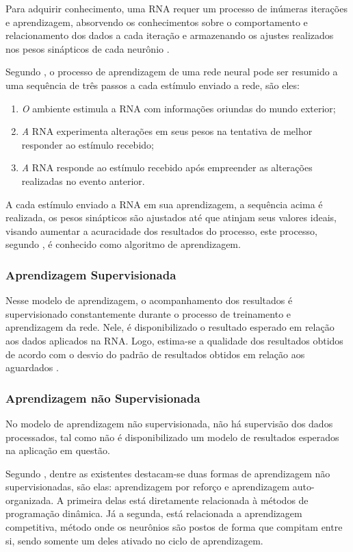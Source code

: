 Para adquirir conhecimento, uma RNA requer um processo de inúmeras iterações e aprendizagem, absorvendo os conhecimentos sobre o comportamento e relacionamento dos dados a cada iteração e armazenando os ajustes realizados nos pesos sinápticos de cada neurônio \cite{neto}.

Segundo , o processo de aprendizagem de uma rede neural pode ser resumido a uma sequência de três passos a cada estímulo enviado a rede, são eles:

\begin{enumerate}
	\item \textit O ambiente estimula a RNA com informações oriundas do mundo exterior;
	\item \textit A RNA experimenta alterações em seus pesos na tentativa de melhor responder ao estímulo recebido;
	\item \textit A RNA responde ao estímulo recebido após empreender as alterações realizadas no evento anterior.
\end{enumerate}

A cada estímulo enviado a RNA em sua aprendizagem, a sequência acima é realizada, os pesos sinápticos são ajustados até que atinjam seus valores ideais, visando aumentar a acuracidade dos resultados do processo, este processo, segundo , é conhecido como algoritmo de aprendizagem.

\subsubsection{Aprendizagem Supervisionada}
Nesse modelo de aprendizagem, o acompanhamento dos resultados é supervisionado constantemente durante o processo de treinamento e aprendizagem da rede. Nele, é disponibilizado o resultado esperado em relação aos dados aplicados na RNA. Logo, estima-se a qualidade dos resultados obtidos de acordo com o desvio do padrão de resultados obtidos em relação aos aguardados \cite{haykin2009}.

\subsubsection{Aprendizagem não Supervisionada}
No modelo de aprendizagem não supervisionada, não há supervisão dos dados processados, tal como não é disponibilizado um modelo de resultados esperados na aplicação em questão.

Segundo , dentre as existentes destacam-se duas formas de aprendizagem não supervisionadas, são elas: aprendizagem por reforço e aprendizagem auto-organizada. A primeira delas está diretamente relacionada à métodos de programação dinâmica. Já a segunda, está relacionada a aprendizagem competitiva, método onde os neurônios são postos de forma que compitam entre si, sendo somente um deles ativado no ciclo de aprendizagem.

